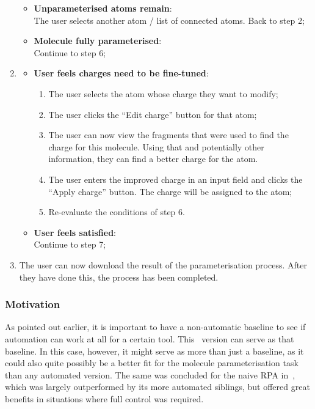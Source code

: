 \begin{enumerate}[itemsep=.1em, parsep=.2em, topsep=0em]
  \begin{itemize}[leftmargin=0cm, itemsep=.1em, parsep=.1em]
  \item[]{\bf Unparameterised atoms remain}:\\The user selects another atom / list of connected atoms. Back to step 2;
  \item[] {\bf Molecule fully parameterised}:\\Continue to step 6;
  \end{itemize}
\item
  \begin{itemize}[leftmargin=0cm, itemsep=.1em, parsep=.1em]
  \item[] {\bf User feels charges need to be fine-tuned}:
    \begin{enumerate}
    \item The user selects the atom whose charge they want to modify;
    \item The user clicks the ``Edit charge'' button for that atom;
    \item The user can now view the fragments that were used to find the charge for this molecule. Using that and potentially other information, they can find a better charge for the atom.
    \item The user enters the improved charge in an input field and clicks the ``Apply charge'' button. The charge will be assigned to the atom;
    \item Re-evaluate the conditions of step 6.
    \end{enumerate}
  \item[]{\bf User feels satisfied}:\\Continue to step 7;
  \end{itemize}
\item The user can now download the result of the parameterisation process. After they have done this, the process has been completed.
\end{enumerate}

\subsubsection{Motivation}
As pointed out earlier, it is important to have a non-automatic baseline to see if automation can work at all for a certain tool. This \IDa\ version can serve as that baseline. In this case, however, it might serve as more than just a baseline, as it could also quite possibly be a better fit for the molecule parameterisation task than any automated version. The same was concluded for the naive RPA in~\cite{payne2000varying}, which was largely outperformed by its more automated siblings, but offered great benefits in situations where full control was required.

